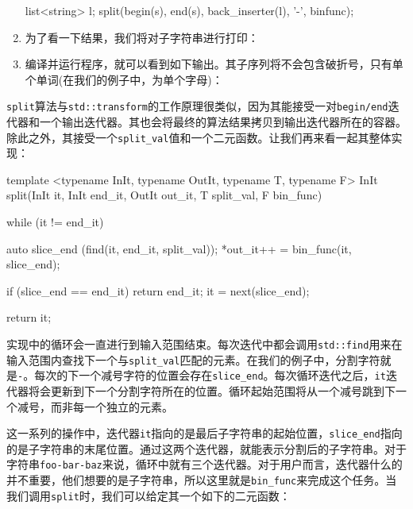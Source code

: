 \begin{enumerate}
\begin{codebox}[cpp]
list<string> l;
split(begin(s), end(s), back_inserter(l), '-', binfunc);
\end{codebox}

\item 为了看一下结果，我们将对子字符串进行打印：

\begin{codebox}[cpp]
    copy(begin(l), end(l), ostream_iterator<string>{cout, "\n"});
} 
\end{codebox}

\item 编译并运行程序，就可以看到如下输出。其子序列将不会包含破折号，只有单个单词(在我们的例子中，为单个字母)：


\end{enumerate}


\texttt{split}算法与\texttt{std::transform}的工作原理很类似，因为其能接受一对\texttt{begin/end}迭代器和一个输出迭代器。其也会将最终的算法结果拷贝到输出迭代器所在的容器。除此之外，其接受一个\texttt{split\_val}值和一个二元函数。让我们再来看一起其整体实现：

\begin{codebox}[cpp]
template <typename InIt, typename OutIt, typename T, typename F>
InIt split(InIt it, InIt end_it, OutIt out_it, T split_val, F bin_func)
{
    while (it != end_it) {
        auto slice_end (find(it, end_it, split_val));
        *out_it++ = bin_func(it, slice_end);
        
        if (slice_end == end_it) { return end_it; }
        it = next(slice_end);
    }
    return it;
}
\end{codebox}

实现中的循环会一直进行到输入范围结束。每次迭代中都会调用\texttt{std::find}用来在输入范围内查找下一个与\texttt{split\_val}匹配的元素。在我们的例子中，分割字符就是\texttt{-}。每次的下一个减号字符的位置会存在\texttt{slice\_end}。每次循环迭代之后，\texttt{it}迭代器将会更新到下一个分割字符所在的位置。循环起始范围将从一个减号跳到下一个减号，而非每一个独立的元素。

这一系列的操作中，迭代器\texttt{it}指向的是最后子字符串的起始位置，\texttt{slice\_end}指向的是子字符串的末尾位置。通过这两个迭代器，就能表示分割后的子字符串。对于字符串\texttt{foo-bar-baz}来说，循环中就有三个迭代器。对于用户而言，迭代器什么的并不重要，他们想要的是子字符串，所以这里就是\texttt{bin\_func}来完成这个任务。当我们调用\texttt{split}时，我们可以给定其一个如下的二元函数：


